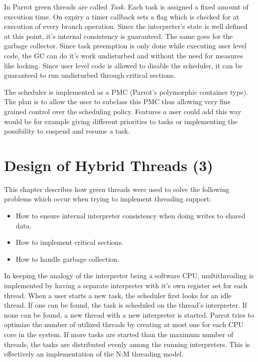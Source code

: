 \documentclass[bachelor,english]{hgbthesis}
\begin{document}
In Parrot green threads are called \textit{Task}. Each task is assigned a fixed amount of execution time. On expiry a timer callback sets a flag which is checked for at execution of every branch operation. Since the interpreter's state is well defined at this point, it's internal consistency is guaranteed. The same goes for the garbage collector. Since task preemption is only done while executing user level code, the GC can do it's work undisturbed and without the need for measures like locking. Since user level code is allowed to disable the scheduler, it can be guaranteed to run undisturbed through critical sections.

The scheduler is implemented as a PMC (Parrot's polymorphic container type). The plan is to allow the user to subclass this PMC thus allowing very fine grained control over the scheduling policy. Features a user could add this way would be for example giving different priorities to tasks or implementing the possibility to suspend and resume a task.

\chapter{Design of Hybrid Threads (3)}

This chapter describes how green threads were used to solve the following problems which occur when trying to implement threading support:
%
\begin{itemize}
\item How to ensure internal interpreter consistency when doing writes to shared data.
\item How to implement critical sections.
\item How to handle garbage collection.
\end{itemize}

In keeping the analogy of the interpreter being a software CPU, multithreading is implemented by having a separate interpreter with it's own register set for each thread. When a user starts a new task, the scheduler first looks for an idle thread. If one can be found, the task is scheduled on the thread's interpreter. If none can be found, a new thread with a new interpreter is started. Parrot tries to optimize the number of utilized threads by creating at most one for each CPU core in the system. If more tasks are started than the maximum number of threads, the tasks are distributed evenly among the running interpreters. This is effectively an implementation of the N:M threading model.
\end{document}
